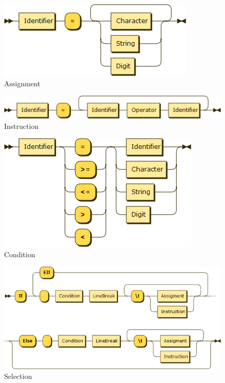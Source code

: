 \begin{figure}[h!]
\centering
\includegraphics[scale=1]{kepek/rr_assignment.png}
\caption{Assignment}
\label{fig:rr_assignment}
\end{figure}

\begin{figure}[h!]
\centering
\includegraphics[scale=0.7]{kepek/rr_instruction.png}
\caption{Instruction}
\label{fig:rr_instruction}
\end{figure}

\begin{figure}[h!]
\centering
\includegraphics[scale=0.4]{kepek/rr_condition.png}
\caption{Condition}
\label{fig:rr_condition}
\end{figure}

\begin{figure}[h!]
\centering
\includegraphics[scale=0.4]{kepek/rr_selection.png}
\caption{Selection}
\label{fig:rr_selection}
\end{figure}

